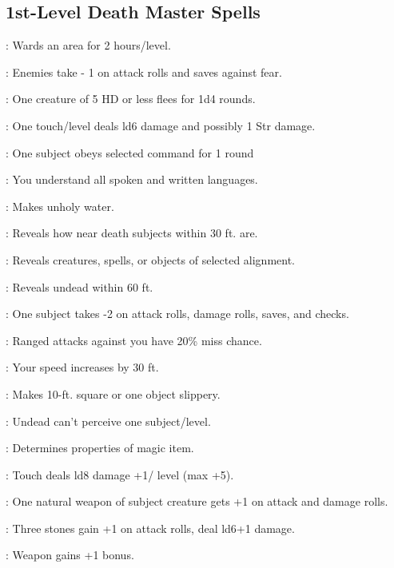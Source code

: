 \begin{multicols}{2}
\subsection{1st-Level Death Master Spells}
\begin{description*}
\item[\linkspell{Alarm}:] Wards an area for 2 hours/level.
\item[\linkspell{Bane}:] Enemies take - 1 on attack rolls and saves against fear.
\item[\linkspell{Cause Fear}:] One creature of 5 HD or less flees for 1d4 rounds.
\item[\linkspell{Chill Touch}:] One touch/level deals ld6 damage and possibly 1 Str damage.
\item[\linkspell{Command}:] One subject obeys selected command for 1 round
\item[\linkspell{Comprehend Languages}:] You understand all spoken and written languages.
\item[\linkspell{Curse Water}:] Makes unholy water.
\item[\linkspell{Deathwatch}:] Reveals how near death subjects within 30 ft. are.
\item[\linkspell{Detect Chaos/Evil/Good/Law}:] Reveals creatures, spells, or objects of selected alignment.
\item[\linkspell{Detect Undead}:] Reveals undead within 60 ft.
\item[\linkspell{Doom}:] One subject takes -2 on attack rolls, damage rolls, saves, and checks.
\item[\linkspell{Entropic Shield}:] Ranged attacks against you have 20\% miss chance.
\item[\linkspell{Expeditious Retreat}:] Your speed increases by 30 ft.
\item[\linkspell{Grease}:] Makes 10-ft. square or one object slippery.
\item[\linkspell{Hide from Undead}:] Undead can't perceive one subject/level.
\item[\linkspell{Identify}:] Determines properties of magic item.
\item[\linkspell{Inflict Light Wounds}:] Touch deals ld8 damage +1/ level (max +5).
\item[\linkspell{Magic Fang}:] One natural weapon of subject creature gets +1 on attack and damage rolls.
\item[\linkspell{Magic Stone}:] Three stones gain +1 on attack rolls, deal ld6+1 damage.
\item[\linkspell{Magic Weapon}:] Weapon gains +1 bonus.

\end{description*}
\end{multicols}
